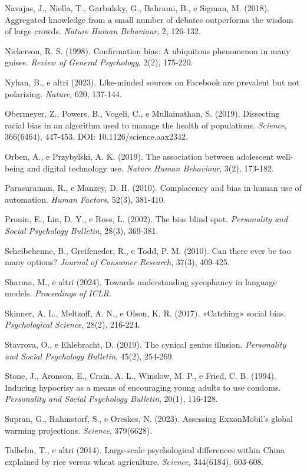 Navajas, J., Niella, T., Garbulsky, G., Bahrami, B., e Sigman, M. (2018). Aggregated knowledge from a small number of debates outperforms the wisdom of large crowds. \textit{Nature Human Behaviour}, 2, 126-132.

Nickerson, R. S. (1998). Confirmation bias: A ubiquitous phenomenon in many guises. \textit{Review of General Psychology}, 2(2), 175-220.

Nyhan, B., e altri (2023). Like-minded sources on Facebook are prevalent but not polarizing. \textit{Nature}, 620, 137-144.

Obermeyer, Z., Powers, B., Vogeli, C., e Mullainathan, S. (2019). Dissecting racial bias in an algorithm used to manage the health of populations. \textit{Science}, 366(6464), 447-453. DOI: 10.1126/science.aax2342.

Orben, A., e Przybylski, A. K. (2019). The association between adolescent well-being and digital technology use. \textit{Nature Human Behaviour}, 3(2), 173-182.

Parasuraman, R., e Manzey, D. H. (2010). Complacency and bias in human use of automation. \textit{Human Factors}, 52(3), 381-410.

Pronin, E., Lin, D. Y., e Ross, L. (2002). The bias blind spot. \textit{Personality and Social Psychology Bulletin}, 28(3), 369-381.

Scheibehenne, B., Greifeneder, R., e Todd, P. M. (2010). Can there ever be too many options? \textit{Journal of Consumer Research}, 37(3), 409-425.

Sharma, M., e altri (2024). Towards understanding sycophancy in language models. \textit{Proceedings of ICLR}.

Skinner, A. L., Meltzoff, A. N., e Olson, K. R. (2017). «Catching» social bias. \textit{Psychological Science}, 28(2), 216-224.

Stavrova, O., e Ehlebracht, D. (2019). The cynical genius illusion. \textit{Personality and Social Psychology Bulletin}, 45(2), 254-269.

Stone, J., Aronson, E., Crain, A. L., Winslow, M. P., e Fried, C. B. (1994). Inducing hypocrisy as a means of encouraging young adults to use condoms. \textit{Personality and Social Psychology Bulletin}, 20(1), 116-128.

Supran, G., Rahmstorf, S., e Oreskes, N. (2023). Assessing ExxonMobil's global warming projections. \textit{Science}, 379(6628).

Talhelm, T., e altri (2014). Large-scale psychological differences within China explained by rice versus wheat agriculture. \textit{Science}, 344(6184), 603-608.

